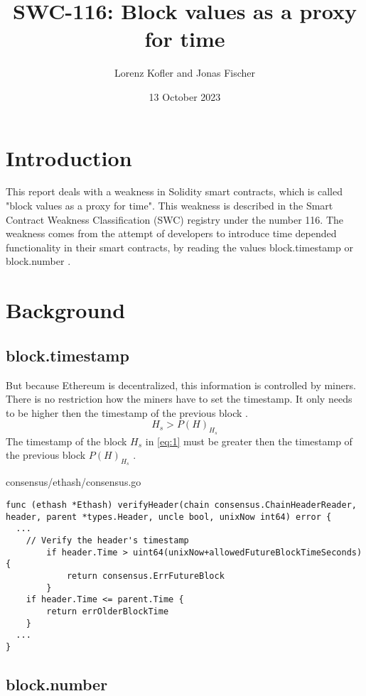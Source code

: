 \documentclass{article}
\title{SWC-116: Block values as a proxy for time}
\author{Lorenz Kofler and Jonas Fischer}
\date{13 October 2023}
\begin{document}
\maketitle
\tableofcontents
\newpage

\section{Introduction}
This report deals with a weakness in Solidity smart contracts, which is called
"block values as a proxy for time". This weakness is described in the Smart
Contract Weakness Classification (SWC) registry under the number 116. \newline
The weakness comes from the attempt of developers to introduce time depended
functionality in their smart contracts, by reading the values block.timestamp
or block.number \cite{swc116}. \newline

\section{Background}

\subsection{block.timestamp}
But because Ethereum is decentralized, this information is controlled by
miners. There is no restriction how the miners have to set the timestamp. It
only needs to be higher then the timestamp of the previous block \cite{Conkas2021}.
\begin{equation} \label{eq:1}
H_s > P(H)_{H_s}
\end{equation}
The timestamp of the block $H_s$ in \ref{eq:1} must be greater then the timestamp of the previous block $P(H)_{H_s}$ \cite{ethyellowpaper2023}.

consensus/ethash/consensus.go
\begin{lstlisting}[laguage=go, caption="\cite{timestamp_code}"]
func (ethash *Ethash) verifyHeader(chain consensus.ChainHeaderReader, header, parent *types.Header, uncle bool, unixNow int64) error {
  ...
	// Verify the header's timestamp
		if header.Time > uint64(unixNow+allowedFutureBlockTimeSeconds) {
			return consensus.ErrFutureBlock
		}
	if header.Time <= parent.Time {
		return errOlderBlockTime
	}
  ...
}
\end{lstlisting}
\cite{timestamp_code}

\subsection{block.number}
\end{document}
